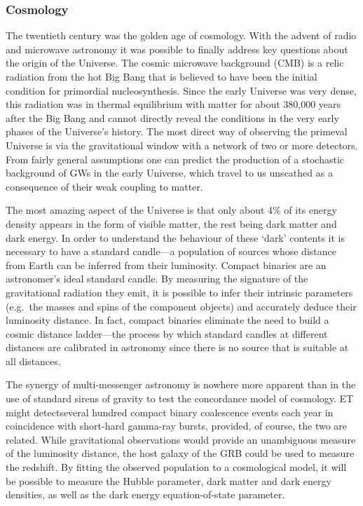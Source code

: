 \subsubsection{Cosmology}
The twentieth century was the golden age of cosmology. With the advent of radio and microwave astronomy it was possible to finally address key questions about the origin of the Universe.  
The cosmic microwave background (CMB) is a relic radiation from the hot Big Bang that is believed to have been the initial condition for primordial nucleosynthesis.
Since the early Universe was very dense, this radiation was in thermal equilibrium with matter for about 380,000 years after the Big Bang and cannot directly reveal the conditions in the very early phases of the Universe's history. 
The most direct way of observing the primeval Universe is via the gravitational window with a network of two or more detectors. 
From fairly general assumptions one can predict the production of a stochastic background of GWs in the early Universe, which travel to us unscathed as a consequence of their weak coupling to matter.

The most amazing aspect of the Universe is that only about 4\% of its energy density appears in the form of visible matter, the rest being dark matter and dark energy. 
In order to understand the behaviour of these `dark' contents it is necessary to have a standard candle---a population of sources whose distance from Earth can be inferred from their luminosity. 
Compact binaries are an astronomer's ideal standard candle. 
By measuring the signature of the gravitational radiation they emit, it is possible to infer their intrinsic parameters (e.g.\ the masses and spins of the component objects) and accurately deduce their luminosity distance. In fact, compact binaries
eliminate the need to build a cosmic distance ladder---the process by which standard candles at different distances are calibrated in astronomy since there is no source that is suitable at all distances.

The synergy of multi-messenger astronomy is nowhere more apparent than in the use of standard sirens of gravity to test the concordance model of cosmology.  ET might detectseveral hundred compact  binary coalescence events each year in coincidence with short-hard gamma-ray bursts, provided, of course, the two are related.  While gravitational observations would provide an unambiguous measure of the luminosity distance, the host galaxy of the GRB could be used to measure the redshift. By fitting the observed population to a cosmological model, it will be possible to measure the Hubble parameter, dark matter and dark energy densities, as well as the dark energy equation-of-state parameter.

